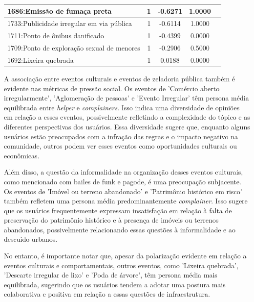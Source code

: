 \begin{table}[htbp]
\begin{tabular}{|l|c|c|c|c|}
		\hline
		1686:Emissão de fumaça preta               & 1                & -0.6271        & 1.0000           \\
		\hline
		1733:Publicidade irregular em via pública  & 1                & -0.6114        & 1.0000           \\
		\hline
		1711:Ponto de ônibus danificado            & 1                & -0.4399        & 0.0000           \\
		\hline
		1709:Ponto de exploração sexual de menores & 1                & -0.2906        & 0.5000           \\
		\hline
		1692:Lixeira quebrada                      & 1                & 0.0188         & 0.0000           \\
		\hline
	\end{tabular}
\end{table}

A associação entre eventos culturais e eventos de zeladoria pública também é evidente nas métricas de pressão social. Os eventos de 'Comércio aberto irregularmente', 'Aglomeração de pessoas' e 'Evento Irregular' têm persona média equilibrada entre \textit{helper} e \textit{complainers}. Isso indica uma diversidade de opiniões em relação a esses eventos, possivelmente refletindo a complexidade do tópico e as diferentes perspectivas dos usuários. Essa diversidade sugere que, enquanto alguns usuários estão preocupados com a infração das regras e o impacto negativo na comunidade, outros podem ver esses eventos como oportunidades culturais ou econômicas.

Além disso, a questão da informalidade na organização desses eventos culturais, como mencionado com bailes de funk e pagode, é uma preocupação subjacente. Os eventos de 'Imóvel ou terreno abandonado' e 'Patrimônio histórico em risco' também refletem uma persona média predominantemente \textit{complainer}. Isso sugere que os usuários frequentemente expressam insatisfação em relação à falta de preservação do patrimônio histórico e à presença de imóveis ou terrenos abandonados, possivelmente relacionando essas questões à informalidade e ao descuido urbanos.

No entanto, é importante notar que, apesar da polarização evidente em relação a eventos culturais e comportamentais, outros eventos, como 'Lixeira quebrada', 'Descarte irregular de lixo' e 'Poda de árvore', têm persona média mais equilibrada, sugerindo que os usuários tendem a adotar uma postura mais colaborativa e positiva em relação a essas questões de infraestrutura.

